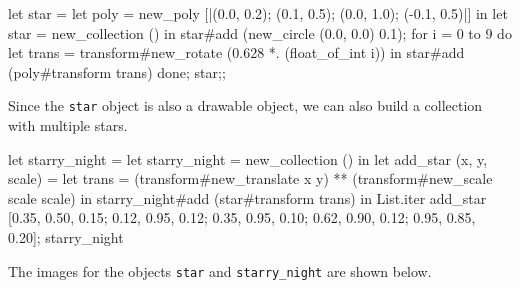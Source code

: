 \begin{ocaml}
let star =
   let poly = new_poly [|(0.0, 0.2); (0.1, 0.5); (0.0, 1.0); (-0.1, 0.5)|] in
   let star = new_collection () in
   star#add (new_circle (0.0, 0.0) 0.1);
   for i = 0 to 9 do
      let trans = transform#new_rotate (0.628 *. (float_of_int i)) in
      star#add (poly#transform trans)
   done;
   star;;
\end{ocaml}
%
Since the \hbox{\lstinline/star/} object is also a drawable object, we can also build a collection with
multiple stars.

\begin{ocaml}
let starry_night =
   let starry_night = new_collection () in
   let add_star (x, y, scale) =
      let trans = (transform#new_translate x y)
         ** (transform#new_scale scale scale) in
      starry_night#add (star#transform trans) in
   List.iter add_star
      [0.35, 0.50, 0.15;
       0.12, 0.95, 0.12;
       0.35, 0.95, 0.10;
       0.62, 0.90, 0.12;
       0.95, 0.85, 0.20];
   starry_night
\end{ocaml}
%
The images for the objects \hbox{\lstinline/star/} and \hbox{\lstinline/starry_night/} are shown below.

